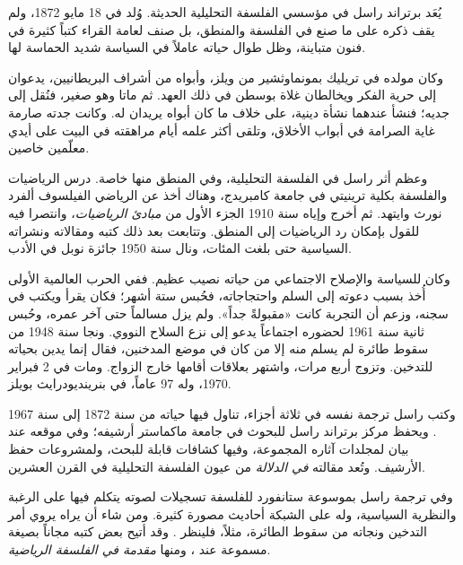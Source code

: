 \documentclass[../../../include/open-logic-section]{subfiles}
\begin{document}



يُعَد برتراند راسل في مؤسسي الفلسفة التحليلية الحديثة. وُلد في 18 مايو
1872، ولم يقف ذكره على ما صنع في الفلسفة والمنطق، بل صنف لعامة القراء
كتباً كثيرة في فنون متباينة، وظل طوال حياته عاملاً في السياسة شديد الحماسة
لها.

وكان مولده في تريليك بمونماوثشير من ويلز، وأبواه من أشراف البريطانيين،
يدعوان إلى حرية الفكر ويخالطان غلاة بوسطن في ذلك العهد. ثم ماتا وهو صغير،
فنُقل إلى جديه؛ فنشأ عندهما نشأة دينية، على خلاف ما كان أبواه يريدان له.
وكانت جدته صارمة غاية الصرامة في أبواب الأخلاق، وتلقى أكثر علمه أيام
مراهقته في البيت على أيدي معلّمين خاصين.

وعظم أثر راسل في الفلسفة التحليلية، وفي المنطق منها خاصة. درس الرياضيات
والفلسفة بكلية ترينيتي في جامعة كامبريدج، وهناك أخذ عن الرياضي الفيلسوف
ألفرد نورث وايتهد. ثم أخرج وإياه سنة 1910 الجزء الأول من \emph{مبادئ
الرياضيات}، وانتصرا فيه للقول بإمكان رد الرياضيات إلى المنطق. وتتابعت بعد
ذلك كتبه ومقالاته ونشراته السياسية حتى بلغت المئات، ونال سنة 1950 جائزة
نوبل في الأدب.

وكان للسياسة والإصلاح الاجتماعي من حياته نصيب عظيم. ففي الحرب العالمية
الأولى أُخذ بسبب دعوته إلى السلم واحتجاجاته، فحُبس ستة أشهر؛ فكان يقرأ
ويكتب في سجنه، وزعم أن التجربة كانت «مقبولةً جداً». ولم يزل مسالماً حتى
آخر عمره، وحُبس ثانية سنة 1961 لحضوره اجتماعاً يدعو إلى نزع السلاح النووي.
ونجا سنة 1948 من سقوط طائرة لم يسلم منه إلا من كان في موضع المدخنين، فقال
إنما يدين بحياته للتدخين. وتزوج أربع مرات، واشتهر بعلاقات أقامها خارج
الزواج. ومات في 2 فبراير 1970، وله 97 عاماً، في بنرينديودرايث بويلز.

\begin{reading}
وكتب راسل ترجمة نفسه في ثلاثة أجزاء، تناول فيها حياته من سنة 1872 إلى سنة
1967 \citep{Russell1967,Russell1968,Russell1969}. ويحفظ مركز برتراند
راسل للبحوث في جامعة ماكماستر أرشيفه؛ وفي موقعه عند \citet{Duncan2015}
بيان لمجلدات آثاره المجموعة، وفيها كشافات قابلة للبحث، ولمشروعات حفظ
الأرشيف. وتُعد مقالته \emph{في الدلالة} \citep{Russell1905} من عيون
الفلسفة التحليلية في القرن العشرين.

وفي ترجمة راسل بموسوعة ستانفورد للفلسفة \citep{Irvine2015} تسجيلات لصوته
يتكلم فيها على الرغبة والنظرية السياسية، وله على الشبكة أحاديث مصورة
كثيرة. ومن شاء أن يراه يروي أمر التدخين ونجاته من سقوط الطائرة، مثلاً،
فلينظر \citet{RussellND}. وقد أتيح بعض كتبه مجاناً بصيغة مسموعة عند
\citet{LibriVoxND}، ومنها \emph{مقدمة في الفلسفة الرياضية}.
\end{reading}
\end{document}
